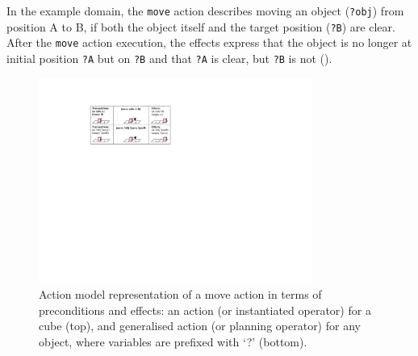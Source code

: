 In the example domain, the \texttt{move} action describes moving an object (\texttt{?obj}) from position A to B, if both the object itself and the target position (\texttt{?B}) are clear.
After the \texttt{move} action execution, the effects express that the object is no longer at initial position \texttt{?A} but on \texttt{?B} and that \texttt{?A} is clear, but \texttt{?B} is not ().

\begin{figure}[h]
	\centering
	\includegraphics[width=0.8\textwidth]{figures/schema-logic}
	\caption{Action model representation of a move action in terms of preconditions and effects: an action (or instantiated operator) for a cube (top), and generalised action (or planning operator) for any object, where variables are prefixed with `?' (bottom).}
	\label{fig:action model}
\end{figure}


